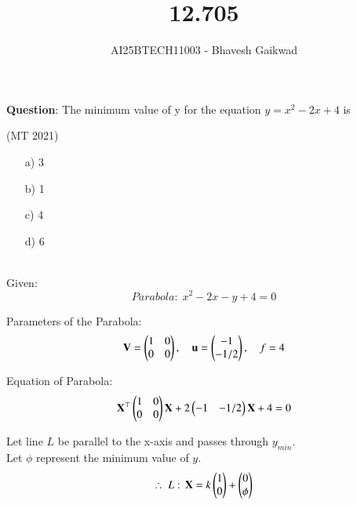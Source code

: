 \documentclass[journal]{IEEEtran}
\begin{document}

\vspace{3cm}

\title{12.705}
\author{AI25BTECH11003 - Bhavesh Gaikwad}
{\let\newpage\relax\maketitle}

\renewcommand{\thefigure}{\theenumi}
\renewcommand{\thetable}{\theenumi}
\setlength{\intextsep}{10pt} 

\renewcommand{\thetable}{\theenumi}


\textbf{Question}: The minimum value of y for the equation $y = x^2 - 2x + 4$ is

\hfill{(MT 2021)}

\begin{itemize}
    \item[a)]3
    \item[b)]1
    \item[c)]4
    \item[d)]6
\end{itemize}

\bigskip

 \solution 
 \\
Given:
\begin{equation}
  Parabola: \;  x^2 - 2x - y + 4 =0
\end{equation}


Parameters of the Parabola:
\begin{equation}
    \mathbf{V} = \begin{pmatrix}1 & 0 \\ 0 & 0\end{pmatrix}, \quad \mathbf{u} = \begin{pmatrix}-1 \\ -1/2\end{pmatrix}, \quad f = 4
\end{equation}

Equation of Parabola:
\begin{equation}
\mathbf{X}^\top\begin{pmatrix}1 & 0 \\ 0 & 0\end{pmatrix}\mathbf{X} + 2\begin{pmatrix}-1 & -1/2\end{pmatrix}\mathbf{X} + 4 = 0    
\end{equation}

Let line $L$ be parallel to the x-axis and passes through $y_{min}$.\\
Let $\phi$ represent the minimum value of $y$.
\begin{equation}
    \therefore \; L: \, \mathbf{X} = k\begin{pmatrix} 1 \\ 0\end{pmatrix} + \begin{pmatrix}0 \\ \phi\end{pmatrix}
\end{equation}
\end{document}
